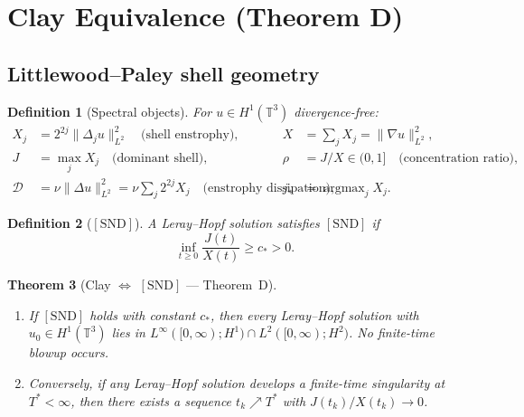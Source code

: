 \documentclass[11pt]{article}
\newtheorem{theorem}{Theorem}[section]
\newtheorem{definition}[theorem]{Definition}
\newcommand{\norm}[2]{\|{#1}\|_{#2}}
\newcommand{\T}{\mathbb{T}}
\newcommand{\DD}{\mathcal{D}}
\begin{document}
\section{Clay Equivalence (Theorem D)}

\subsection{Littlewood--Paley shell geometry}

\begin{definition}[Spectral objects]\label{def:spectral}
For $u\in H^1(\T^3)$ divergence-free:
\begin{align*}
  X_j &= 2^{2j}\norm{\Delta_j u}{L^2}^2
     \quad\text{(shell enstrophy)},
  &X &= \sum_j X_j = \norm{\nabla u}{L^2}^2,\\
  J &= \max_j X_j
     \quad\text{(dominant shell)},
  &\rho &= J/X\in(0,1]
     \quad\text{(concentration ratio)},\\
  \DD &= \nu\norm{\Delta u}{L^2}^2 = \nu\sum_j 2^{2j}X_j
     \quad\text{(enstrophy dissipation)},
  &j_* &= \operatorname{argmax}_j X_j.
\end{align*}
\end{definition}

\begin{definition}[{$[\mathrm{SND}]$}]\label{def:SND}
A Leray--Hopf solution satisfies $[\mathrm{SND}]$ if
\[
  \inf_{t\ge0}\frac{J(t)}{X(t)} \ge c_* > 0.
\]
\end{definition}

\begin{theorem}[{Clay $\Leftrightarrow$ $[\mathrm{SND}]$ --- Theorem~D}]
\label{thm:D}
\begin{enumerate}[label=\rm(\roman*)]
\item If\/ $[\mathrm{SND}]$ holds with constant $c_*$, then
  every Leray--Hopf solution with $u_0\in H^1(\T^3)$
  lies in $L^\infty([0,\infty);H^1)\cap L^2([0,\infty);H^2)$.
  No finite-time blowup occurs.
\item Conversely, if any Leray--Hopf solution develops a
  finite-time singularity at $T^*<\infty$, then there exists
  a sequence $t_k\nearrow T^*$ with $J(t_k)/X(t_k)\to0$.
\end{enumerate}
\end{theorem}
\end{document}
